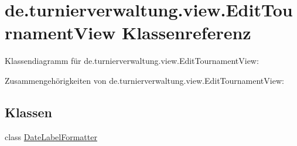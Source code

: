 \hypertarget{classde_1_1turnierverwaltung_1_1view_1_1_edit_tournament_view}{}\section{de.\+turnierverwaltung.\+view.\+Edit\+Tournament\+View Klassenreferenz}
\label{classde_1_1turnierverwaltung_1_1view_1_1_edit_tournament_view}


Klassendiagramm für de.\+turnierverwaltung.\+view.\+Edit\+Tournament\+View\+:


Zusammengehörigkeiten von de.\+turnierverwaltung.\+view.\+Edit\+Tournament\+View\+:
\subsection*{Klassen}
\begin{DoxyCompactItemize}
\item 
class \hyperlink{classde_1_1turnierverwaltung_1_1view_1_1_edit_tournament_view_1_1_date_label_formatter}{Date\+Label\+Formatter}
\end{DoxyCompactItemize}
